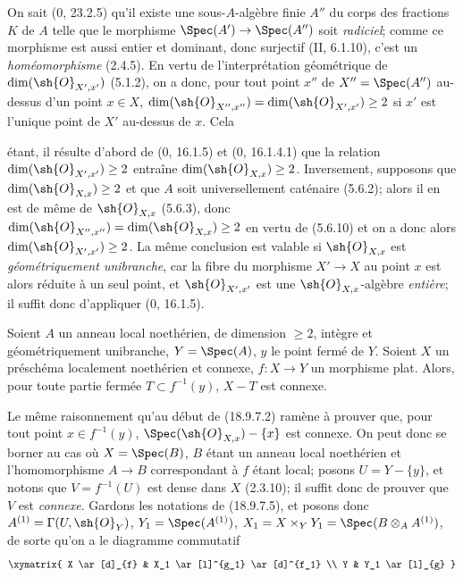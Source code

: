 \begin{remark}[18.9.7.6]
\label{IV.18.9.7.6}
On sait (0, 23.2.5) qu'il existe une sous-$A$-algèbre finie $A''$ du corps des fractions $K$ de $A$ telle que le morphisme $\Spec(A')\to\Spec(A'')$ soit \emph{radiciel}; comme ce morphisme est aussi entier et dominant, donc surjectif (II, 6.1.10), c'est un \emph{homéomorphisme} (2.4.5). En vertu de l'interprétation géométrique de $\dim(\sh{O}_{X',x'})$ (5.1.2), on a donc, pour tout point $x''$ de $X''=\Spec(A'')$ au-dessus d'un point $x\in X$, $\dim(\sh{O}_{X'',x''})=\dim(\sh{O}_{X',x'})\geq 2$ si $x'$ est l'unique point de $X'$ au-dessus de $x$. Cela


étant, il résulte d'abord de (0, 16.1.5) et (0, 16.1.4.1) que la relation $\dim(\sh{O}_{X',x'})\geq 2$ entraîne $\dim(\sh{O}_{X,x})\geq 2$. Inversement, supposons que $\dim(\sh{O}_{X,x})\geq 2$ et que $A$ soit universellement caténaire (5.6.2); alors il en est de même de $\sh{O}_{X,x}$ (5.6.3), donc $\dim(\sh{O}_{X'',x''})=\dim(\sh{O}_{X,x})\geq 2$ en vertu de (5.6.10) et on a donc alors $\dim(\sh{O}_{X',x'})\geq 2$. La même conclusion est valable si $\sh{O}_{X,x}$ est \emph{géométriquement unibranche}, car la fibre du morphisme $X'\to X$ au point $x$ est alors réduite à un seul point, et $\sh{O}_{X',x'}$ est une $\sh{O}_{X,x}$-algèbre \emph{entière}; il suffit donc d'appliquer (0, 16.1.5).
\end{remark}

\begin{lemma}[18.9.7.7]
\label{IV.18.9.7.7}
Soient $A$ un anneau local noethérien, de dimension $\geq 2$, intègre et géométriquement unibranche, $Y=\Spec(A)$, $y$ le point fermé de $Y$. Soient $X$ un préschéma localement noethérien et connexe, $f:X\to Y$ un morphisme plat. Alors, pour toute partie fermée $T\subset f^{-1}(y)$, $X-T$ est connexe.
\end{lemma}

Le même raisonnement qu'au début de (18.9.7.2) ramène à prouver que, pour tout point $x\in f^{-1}(y)$, $\Spec(\sh{O}_{X,x})-\{x\}$ est connexe. On peut donc se borner au cas où $X=\Spec(B)$, $B$ étant un anneau local noethérien et l'homomorphisme $A\to B$ correspondant à $f$ étant local; posons $U=Y-\{y\}$, et notons que $V=f^{-1}(U)$ est dense dans $X$ (2.3.10); il suffit donc de prouver que $V$ est \emph{connexe}. Gardons les notations de (18.9.7.5), et posons donc $A^{(1)}=\Gamma(U,\sh{O}_Y)$, $Y_1=\Spec(A^{(1)})$, $X_1=X\times_Y Y_1=\Spec(B\otimes_A A^{(1)})$, de sorte qu'on a le diagramme commutatif
\[
  \xymatrix{
    X \ar[d]_{f} & X_1 \ar[l]^{g_1} \ar[d]^{f_1} \\
    Y & Y_1 \ar[l]_{g}
  }
\]

